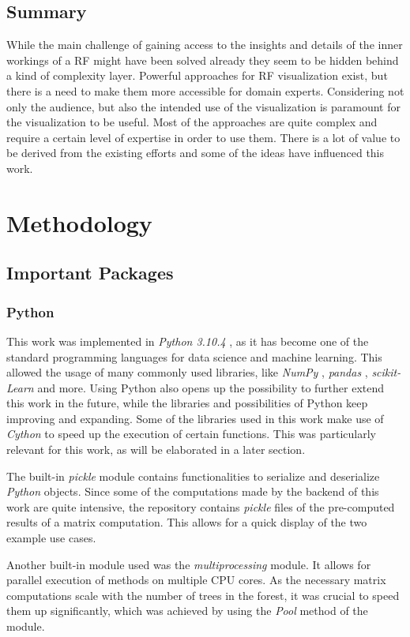 \documentclass[a4paper, 12pt]{article}
\begin{document}
\subsection{Summary}
While the main challenge of gaining access to the insights and details of the inner workings
of a RF might have been solved already they seem to be hidden behind a kind of complexity
layer. Powerful approaches for RF visualization exist, but there is a need to make them more
accessible for domain experts. Considering not only the audience, but also the intended
use of the visualization is paramount for the visualization to be useful. Most of the
approaches are quite complex and require a certain level of expertise in order to use them.
There is a lot of value to be derived from the existing efforts and some of the ideas have
influenced this work.

\section{Methodology}
\subsection {Important Packages}
\subsubsection{Python}
This work was implemented in \textit{Python 3.10.4} \cite{10.5555/1593511}, as it has
become one of the standard programming languages for data science and machine learning.
This allowed the usage of many commonly used libraries, like \textit{NumPy} \cite{harris2020array},
\textit{pandas} \cite{mckinney-proc-scipy-2010}, \textit{scikit-Learn} \cite{scikit-learn} and more.
Using Python also opens up the possibility to further extend this work in the future, while
the libraries and possibilities of Python keep improving and expanding.
Some of the libraries used in this work make use of \textit{Cython} \cite{behnel2011cython} to
speed up the execution of certain functions. This was particularly relevant for this work, as will
be elaborated in a later section. \par
The built-in \textit{pickle} module contains functionalities to serialize and deserialize
\textit{Python} objects.
Since some of the computations made by the backend of this work are quite intensive, the repository
contains \textit{pickle} files of the pre-computed results of a matrix computation. This allows
for a quick display of the two example use cases. \par
Another built-in module used was the \textit{multiprocessing} module. It allows for parallel
execution of methods on multiple CPU cores. As the necessary matrix computations scale with the
number of trees in the forest, it was crucial to speed them up significantly, which was achieved
by using the \textit{Pool} method of the module.
\end{document}
